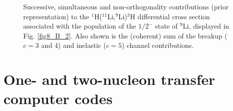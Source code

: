 \begin{subappendices}
\begin{figure}
        	\caption{Successive, simultaneous and non-orthogonality contributions (prior representation)
        	to the  $^1$H($^{11}$Li,$^9$Li)$^3$H differential cross section
        	associated with the population of the $1/2^-$ state
        	of $^9$Li, displayed in Fig. \ref{fig8_B_2}. Also shown is the (coherent) sum of the breakup ($c=3$ and 4) and inelastic ($c=5$) channel contributions.}\label{fig8_B_3}
        \end{figure}

\section{One- and two-nucleon transfer computer codes}\label{C8AppD}
%
%
%
%
%
%
%
%
%

\end{subappendices}

